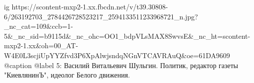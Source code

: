  
 
 
 
 

\ifcmt
  ig https://scontent-mxp2-1.xx.fbcdn.net/v/t39.30808-6/263192703_2784426728523217_2594133511233968721_n.jpg?_nc_cat=109&ccb=1-5&_nc_sid=b9115d&_nc_ohc=OO1_bdpVLsMAX8SwvsE&_nc_ht=scontent-mxp2-1.xx&oh=00_AT-W4E0L3scjiUpYYZfvd3P6XpAlwjsndqNGnVTCAVRAuQ&oe=61DA9609
  @caption @label 5: Василий Витальевич Шульгин. Политик, редактор газеты "КиевлянинЪ", идеолог Белого движения.
\fi
